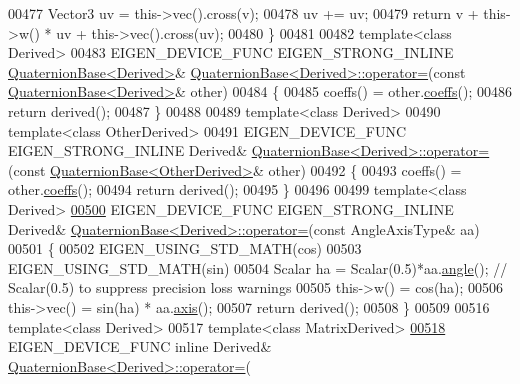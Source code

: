 \begin{DoxyCode}
00477     Vector3 uv = this->vec().cross(v);
00478     uv += uv;
00479     \textcolor{keywordflow}{return} v + this->w() * uv + this->vec().cross(uv);
00480 \}
00481 
00482 \textcolor{keyword}{template}<\textcolor{keyword}{class} Derived>
00483 EIGEN\_DEVICE\_FUNC EIGEN\_STRONG\_INLINE \hyperlink{group___geometry___module_class_eigen_1_1_quaternion_base}{QuaternionBase<Derived>}& 
      \hyperlink{group___geometry___module_class_eigen_1_1_quaternion_base}{QuaternionBase<Derived>::operator=}(\textcolor{keyword}{const} 
      \hyperlink{group___geometry___module_class_eigen_1_1_quaternion_base}{QuaternionBase<Derived>}& other)
00484 \{
00485   coeffs() = other.\hyperlink{group___geometry___module_aa7bb3fc337ffa82b0ad795783eb8a2ce}{coeffs}();
00486   \textcolor{keywordflow}{return} derived();
00487 \}
00488 
00489 \textcolor{keyword}{template}<\textcolor{keyword}{class} Derived>
00490 \textcolor{keyword}{template}<\textcolor{keyword}{class} OtherDerived>
00491 EIGEN\_DEVICE\_FUNC EIGEN\_STRONG\_INLINE Derived& 
      \hyperlink{group___geometry___module_class_eigen_1_1_quaternion_base}{QuaternionBase<Derived>::operator=}(\textcolor{keyword}{const} 
      \hyperlink{group___geometry___module_class_eigen_1_1_quaternion_base}{QuaternionBase<OtherDerived>}& other)
00492 \{
00493   coeffs() = other.\hyperlink{group___geometry___module_aa7bb3fc337ffa82b0ad795783eb8a2ce}{coeffs}();
00494   \textcolor{keywordflow}{return} derived();
00495 \}
00496 
00499 \textcolor{keyword}{template}<\textcolor{keyword}{class} Derived>
\hyperlink{group___geometry___module_af2f49bb475fcfd4965803787c8784d13}{00500} EIGEN\_DEVICE\_FUNC EIGEN\_STRONG\_INLINE Derived& 
      \hyperlink{group___geometry___module_class_eigen_1_1_quaternion_base}{QuaternionBase<Derived>::operator=}(\textcolor{keyword}{const} AngleAxisType& aa)
00501 \{
00502   EIGEN\_USING\_STD\_MATH(cos)
00503   EIGEN\_USING\_STD\_MATH(sin)
00504   Scalar ha = Scalar(0.5)*aa.\hyperlink{group___geometry___module_a83d3c08a73c111550b7e480d3ed043d4}{angle}(); \textcolor{comment}{// Scalar(0.5) to suppress precision loss warnings}
00505   this->w() = cos(ha);
00506   this->vec() = sin(ha) * aa.\hyperlink{group___geometry___module_ae40cc36c8dcd9977e1540d91a80696bb}{axis}();
00507   \textcolor{keywordflow}{return} derived();
00508 \}
00509 
00516 \textcolor{keyword}{template}<\textcolor{keyword}{class} Derived>
00517 \textcolor{keyword}{template}<\textcolor{keyword}{class} MatrixDerived>
\hyperlink{group___geometry___module_a69cdb4a53e1f582627b74bbabbb80d7a}{00518} EIGEN\_DEVICE\_FUNC \textcolor{keyword}{inline} Derived& \hyperlink{group___geometry___module_class_eigen_1_1_quaternion_base}{QuaternionBase<Derived>::operator=}(\textcolor{keyword}{
}
\end{DoxyCode}
